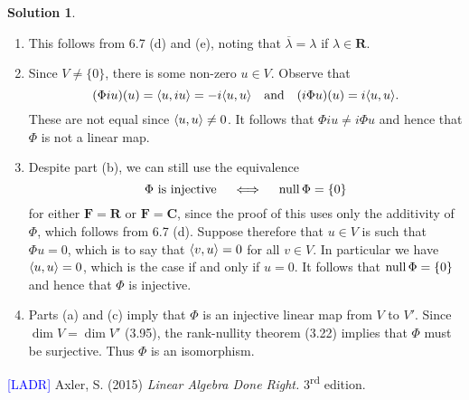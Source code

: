 \documentclass[12pt]{article}
\theoremstyle{definition}
\theoremstyle{exercise}
\theoremstyle{solution}
\newtheorem*{solution}{Solution}
\newcommand{\ts}{\textsuperscript}
\newcommand{\Null}{\text{null\,}}
\newcommand{\quand}{\quad \text{and} \quad}
\newcommand{\R}{\mathbf{R}}
\newcommand{\C}{\mathbf{C}}
\newcommand{\F}{\mathbf{F}}
\DeclarePairedDelimiter\ip{\langle}{\rangle}
\begin{document}
\begin{solution}
    \begin{enumerate}
        \item This follows from 6.7 (d) and (e), noting that \( \overline{\lambda} = \lambda \) if \( \lambda \in \R \).

        \item Since \( V \neq \{ 0 \} \), there is some non-zero \( u \in V \). Observe that
        \[
            (\Phi iu)(u) = \ip{u, iu} = -i \ip{u, u} \quand (i \Phi u)(u) = i \ip{u, u}.
        \]
        These are not equal since \( \ip{u, u} \neq 0 \). It follows that \( \Phi iu \neq i \Phi u \) and hence that \( \Phi \) is not a linear map.

        \item Despite part (b), we can still use the equivalence
        \[
            \Phi \text{ is injective} \quad \iff \quad \Null \Phi = \{ 0 \}
        \]
        for either \( \F = \R \) or \( \F = \C \), since the proof of this uses only the additivity of \( \Phi \), which follows from 6.7 (d). Suppose therefore that \( u \in V \) is such that \( \Phi u = 0 \), which is to say that \( \ip{v, u} = 0 \) for all \( v \in V \). In particular we have \( \ip{u, u} = 0 \), which is the case if and only if \( u = 0 \). It follows that \( \Null \Phi = \{ 0 \} \) and hence that \( \Phi \) is injective.

        \item Parts (a) and (c) imply that \( \Phi \) is an injective linear map from \( V \) to \( V' \). Since \( \dim V = \dim V' \) (3.95), the rank-nullity theorem (3.22) implies that \( \Phi \) must be surjective. Thus \( \Phi \) is an isomorphism.
    \end{enumerate}
\end{solution}

\noindent \hrulefill

\noindent \hypertarget{ladr}{\textcolor{blue}{[LADR]} Axler, S. (2015) \textit{Linear Algebra Done Right.} 3\ts{rd} edition.}
\end{document}
